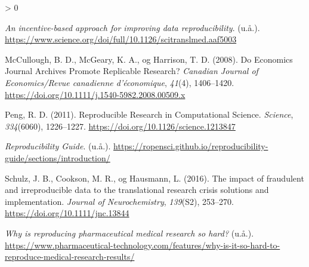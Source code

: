 \documentclass[
  12pt,
  norsk,
]{article}
\newlength{\cslhangindent}
\newenvironment{CSLReferences}[2] %
 {%
  \setlength{\parindent}{0pt}
  \ifodd #1 \everypar{\setlength{\hangindent}{\cslhangindent}}\ignorespaces\fi
  \ifnum #2 > 0
  \setlength{\parskip}{#2\baselineskip}
  \fi
 }%
 {}
\begin{document}
\hypertarget{refs}{}
\begin{CSLReferences}{1}{0}
\leavevmode\hypertarget{ref-Science.org}{}%
\emph{An incentive-based approach for improving data reproducibility}.
(u.å.).
\url{https://www.science.org/doi/full/10.1126/scitranslmed.aaf5003}

\leavevmode\hypertarget{ref-mccullough2008}{}%
McCullough, B. D., McGeary, K. A., og Harrison, T. D. (2008). Do
Economics Journal Archives Promote Replicable Research? \emph{Canadian
Journal of Economics/Revue canadienne d'économique}, \emph{41}(4),
1406--1420. \url{https://doi.org/10.1111/j.1540-5982.2008.00509.x}

\leavevmode\hypertarget{ref-peng2011}{}%
Peng, R. D. (2011). Reproducible {Research} in {Computational Science}.
\emph{Science}, \emph{334}(6060), 1226--1227.
\url{https://doi.org/10.1126/science.1213847}

\leavevmode\hypertarget{ref-Git-reproducabilty}{}%
\emph{Reproducibility Guide}. (u.å.).
\url{https://ropensci.github.io/reproducibility-guide/sections/introduction/}

\leavevmode\hypertarget{ref-schulz2016}{}%
Schulz, J. B., Cookson, M. R., og Hausmann, L. (2016). The impact of
fraudulent and irreproducible data to the translational research crisis
{{}} solutions and implementation. \emph{Journal of Neurochemistry},
\emph{139}(S2), 253--270. \url{https://doi.org/10.1111/jnc.13844}

\leavevmode\hypertarget{ref-Pharm-tech}{}%
\emph{Why is reproducing pharmaceutical medical research so hard?}
(u.å.).
\url{https://www.pharmaceutical-technology.com/features/why-is-it-so-hard-to-reproduce-medical-research-results/}

\end{CSLReferences}
\end{document}
